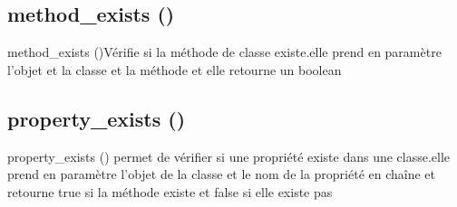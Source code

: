 \documentclass[12pt,b5paper]{article}
\begin{document}
\subsection{ method\_exists ()}
 method\_exists ()Vérifie si la méthode de classe existe.elle prend en paramètre l'objet et la classe et la méthode et elle retourne un boolean
\subsection{ property\_exists ()}
 property\_exists () permet de vérifier si une propriété existe dans une classe.elle prend en paramètre l'objet de la classe et le nom de la propriété en chaîne et retourne true si la méthode existe et false si elle existe pas
 
 
 
\end{document}
